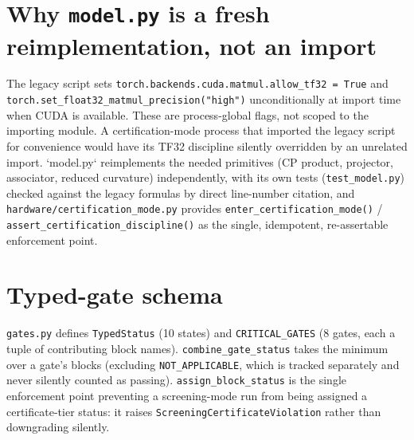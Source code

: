 \documentclass[11pt]{amsart}
\begin{document}
\section{Why \texttt{model.py} is a fresh reimplementation, not an import}
The legacy script sets \texttt{torch.backends.cuda.matmul.allow\_tf32 =
True} and \texttt{torch.set\_float32\_matmul\_precision("high")}
unconditionally at import time when CUDA is available. These are
process-global flags, not scoped to the importing module. A certification-mode
process that imported the legacy script for convenience would have its
TF32 discipline silently overridden by an unrelated import. `model.py`
reimplements the needed primitives (CP product, projector, associator,
reduced curvature) independently, with its own tests
(\texttt{test\_model.py}) checked against the legacy formulas by direct
line-number citation, and \texttt{hardware/certification\_mode.py}
provides \texttt{enter\_certification\_mode()} / \\
\texttt{assert\_certification\_discipline()} as the single, idempotent,
re-assertable enforcement point.

\section{Typed-gate schema}
\texttt{gates.py} defines \texttt{TypedStatus} (10 states) and
\texttt{CRITICAL\_GATES} (8 gates, each a tuple of contributing block
names). \texttt{combine\_gate\_status} takes the minimum over a gate's
blocks (excluding \texttt{NOT\_APPLICABLE}, which is tracked separately
and never silently counted as passing). \texttt{assign\_block\_status}
is the single enforcement point preventing a screening-mode run from
being assigned a certificate-tier status: it raises
\texttt{ScreeningCertificateViolation} rather than downgrading silently.
\end{document}
